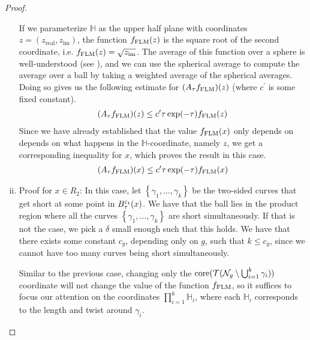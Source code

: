\begin{proof}
\begin{enumerate}[(i)]
    If we parameterize $\mathbb{H}$ as the upper half plane with coordinates $z = (z_{\mathrm{real}}, z_{\mathrm{im}})$, the function $f_{\mathrm{FLM}}(z)$ is the square root of the second coordinate, i.e. $f_{\mathrm{FLM}}(z) = \sqrt{z_{\mathrm{im}}}$.
    The average of this function over a sphere is well-understood (see \cite[Lemma 4.2]{EskinMozes+2022+342+361}), and we can use the spherical average to compute the average over a ball by taking a weighted average of the spherical averages.
    Doing so gives us the following estimate for $(A_{\tau}f_{\mathrm{FLM}})(z)$ (where $c^{\prime}$ is some fixed constant).
    \begin{align*}
      (A_{\tau}f_{\mathrm{FLM}})(z) \leq c^{\prime} \tau \exp(-\tau) f_{\mathrm{FLM}}(z)
    \end{align*}
    Since we have already established that the value $f_{\mathrm{FLM}}(x)$ only depends on depends on what happens in the $\mathbb{H}$-coordinate, namely $z$, we get a corresponding inequality for $x$, which proves the result in this case.
    \begin{align*}
      (A_{\tau}f_{\mathrm{FLM}})(x) \leq c^{\prime} \tau \exp(-\tau) f_{\mathrm{FLM}}(x)
    \end{align*}
  \item Proof for $x \in R_2$: In this case, let $\left\{ \gamma_1, \ldots, \gamma_k \right\}$ be the two-sided curves that get short at some point in $B_{\tau}^{\varepsilon_t}(x)$.
    We have that the ball lies in the product region where all the curves $\left\{ \gamma_1, \ldots, \gamma_k \right\}$ are short simultaneously.
    If that is not the case, we pick a $\delta$ small enough such that this holds.
    We have that there exists some constant $c_g$, depending only on $g$, such that $k \leq c_g$, since we cannot have too many curves being short simultaneously.

    Similar to the previous case, changing only the $\mathrm{core}(\mathcal{T}(\mathcal{N}_g \setminus \bigcup_{i=1}^k \gamma_i))$ coordinate will not change the value of the function $f_{\mathrm{FLM}}$, so it suffices to focus our attention on the coordinates $\prod_{i=1}^k \mathbb{H}_i$, where each $\mathbb{H}_i$ corresponds to the length and twist around $\gamma_i$.


\end{enumerate}
\end{proof}
